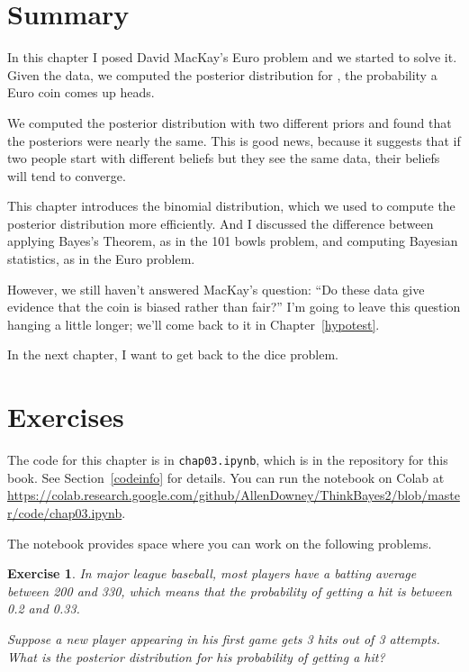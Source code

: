 \documentclass[12pt]{book}
\theoremstyle{exercise}
\newtheorem{exercise}{Exercise}[chapter]
\begin{document}
\section{Summary}

In this chapter I posed David MacKay's Euro problem and we started to solve it.
Given the data, we computed the posterior distribution for , the probability a Euro coin comes up heads.

We computed the posterior distribution with two different priors and found that the posteriors were nearly the same.
This is good news, because it suggests that if two people start with different beliefs but they see the same data, their beliefs will tend to converge.

This chapter introduces the binomial distribution, which we used to compute the posterior distribution more efficiently.
And I discussed the difference between applying Bayes's Theorem, as in the 101 bowls problem, and computing Bayesian statistics, as in the Euro problem.


However, we still haven't answered MacKay's question: ``Do these data give evidence that the coin is biased rather than fair?''
I'm going to leave this question hanging a little longer; we'll come back to it in Chapter~\ref{hypotest}.

In the next chapter, I want to get back to the dice problem.

\section{Exercises}

The code for this chapter is in {\tt chap03.ipynb}, which is in the repository for this book.  See Section~\ref{codeinfo} for details.
You can run the notebook on Colab at \url{https://colab.research.google.com/github/AllenDowney/ThinkBayes2/blob/master/code/chap03.ipynb}.

The notebook provides space where you can work on the following problems.


\begin{exercise}
In major league baseball, most players have a batting average between 200 and 330, which means that the probability of getting a hit is between 0.2 and 0.33.

Suppose a new player appearing in his first game gets 3 hits out of 3 attempts.  What is the posterior distribution for his probability of getting a hit?
\end{exercise}
\end{document}
